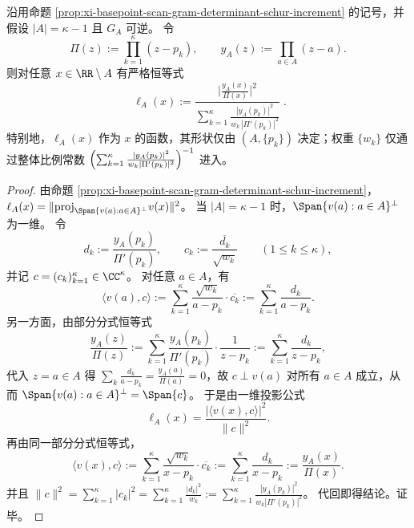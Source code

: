 \begin{theorem}\label{thm:xi-basepoint-scan-leverage-gap-codim1-closed-form}
沿用命题 \ref{prop:xi-basepoint-scan-gram-determinant-schur-increment} 的记号，并假设 \(|A|=\kappa-1\) 且 \(G_A\) 可逆。
令
\[
\Pi(z):=\prod_{k=1}^{\kappa}(z-p_k),
\qquad
y_A(z):=\prod_{a\in A}(z-a).
\]
则对任意 \(x\in\RR\setminus A\) 有严格恒等式
\[
\boxed{\;
\ell_A(x)
:=
\frac{\bigl|\frac{y_A(x)}{\Pi(x)}\bigr|^2}{
\displaystyle\sum_{k=1}^{\kappa}\frac{|y_A(p_k)|^2}{w_k\,|\Pi'(p_k)|^2}
}\; }.
\]
特别地，\(\ell_A(x)\) 作为 \(x\) 的函数，其形状仅由 \((A,\{p_k\})\) 决定；权重 \(\{w_k\}\) 仅通过整体比例常数
\(
\Bigl(\sum_{k=1}^{\kappa}\frac{|y_A(p_k)|^2}{w_k|\Pi'(p_k)|^2}\Bigr)^{-1}
\)
进入。
\end{theorem}
\begin{proof}
由命题 \ref{prop:xi-basepoint-scan-gram-determinant-schur-increment}，
\(
\ell_A(x)=\| \mathrm{proj}_{\Span\{v(a):a\in A\}^\perp}v(x)\|^2
\)。
当 \(|A|=\kappa-1\) 时，\(\Span\{v(a):a\in A\}^\perp\) 为一维。
令
\[
d_k:=\frac{y_A(p_k)}{\Pi'(p_k)},
\qquad
c_k:=\frac{\overline{d_k}}{\sqrt{w_k}}
\qquad(1\le k\le \kappa),
\]
并记 \(c=(c_k)_{k=1}^{\kappa}\in\CC^\kappa\)。
对任意 \(a\in A\)，有
\[
\langle v(a),c\rangle
:=\sum_{k=1}^{\kappa}\frac{\sqrt{w_k}}{a-p_k}\cdot\overline{c_k}
:=\sum_{k=1}^{\kappa}\frac{d_k}{a-p_k}.
\]
另一方面，由部分分式恒等式
\[
\frac{y_A(z)}{\Pi(z)}
:=\sum_{k=1}^{\kappa}\frac{y_A(p_k)}{\Pi'(p_k)}\cdot\frac{1}{z-p_k}
:=\sum_{k=1}^{\kappa}\frac{d_k}{z-p_k},
\]
代入 \(z=a\in A\) 得
\(
\sum_k\frac{d_k}{a-p_k}=\frac{y_A(a)}{\Pi(a)}=0
\)，故 \(c\perp v(a)\) 对所有 \(a\in A\) 成立，从而
\(
\Span\{v(a):a\in A\}^\perp=\Span\{c\}
\)。
于是由一维投影公式
\[
\ell_A(x)=\frac{|\langle v(x),c\rangle|^2}{\|c\|^2}.
\]
再由同一部分分式恒等式，
\[
\langle v(x),c\rangle
:=\sum_{k=1}^{\kappa}\frac{\sqrt{w_k}}{x-p_k}\cdot\overline{c_k}
:=\sum_{k=1}^{\kappa}\frac{d_k}{x-p_k}
:=\frac{y_A(x)}{\Pi(x)}.
\]
并且
\(
\|c\|^2=\sum_{k=1}^{\kappa}|c_k|^2=\sum_{k=1}^{\kappa}\frac{|d_k|^2}{w_k}
:=\sum_{k=1}^{\kappa}\frac{|y_A(p_k)|^2}{w_k|\Pi'(p_k)|^2}
\)。
代回即得结论。证毕。
\end{proof}

